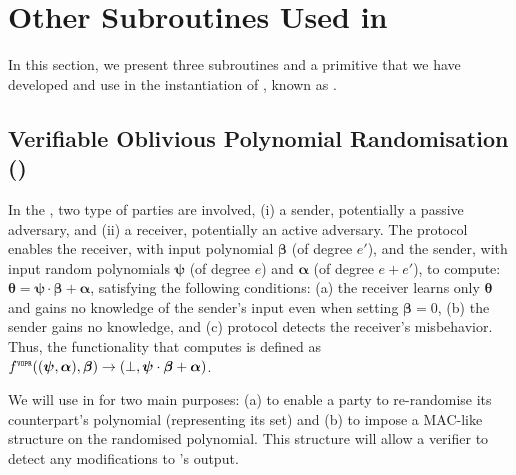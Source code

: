 

\vspace{-3mm}



\section{Other Subroutines Used in \withFai}\label{sec::subroutines}
\vspace{-1mm}

In this section, we present three subroutines and a primitive that we have developed and use in the instantiation of \p, known as \withFai. 


\vspace{-3mm}
\subsection{Verifiable Oblivious Polynomial Randomisation (\vopr)}\label{sec::vopr}
\vspace{-1mm}


In the \vopr, two type of parties are involved, (i) a sender, potentially a passive adversary, and (ii) a receiver, potentially an active adversary. The protocol enables the receiver, with input polynomial $\bm\beta$ (of degree $e'$), and the sender, with input random polynomials $\bm\psi$ (of degree $e$) and  $\bm{\alpha}$ (of degree $e+e'$),   to compute: $\bm\theta=\bm\psi\cdot \bm\beta+\bm\alpha$, satisfying the following conditions: (a) the receiver learns only $\bm\theta$ and gains no knowledge of the sender's input even when setting $\bm \beta=0$, (b) the sender gains no knowledge, and (c) protocol detects the receiver's misbehavior.  Thus, the functionality that  \vopr computes is defined as $f^{\scriptscriptstyle {\ensuremath{\mathtt{VOPR}}}}( (\bm\psi, \bm{\alpha}), \bm\beta)\rightarrow(\bot, \bm\psi\cdot \bm\beta+\bm\alpha)$. 

We will use {\vopr} in \withFai for two main purposes:  (a) to enable a party to re-randomise its counterpart's polynomial (representing its set) and (b) to impose a MAC-like structure on the randomised polynomial.  This structure will allow a verifier to detect any modifications to \vopr's output. 

